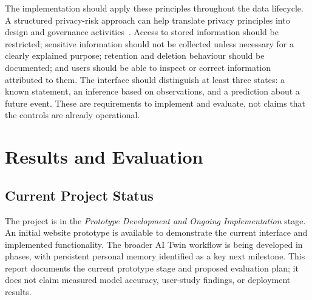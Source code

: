 \documentclass{tietreport}
\begin{document}
The implementation should apply these principles throughout the data lifecycle. A structured privacy-risk approach can help translate privacy principles into design and governance activities~\cite{nistprivacy2020}. Access to stored information should be restricted; sensitive information should not be collected unless necessary for a clearly explained purpose; retention and deletion behaviour should be documented; and users should be able to inspect or correct information attributed to them. The interface should distinguish at least three states: a known statement, an inference based on observations, and a prediction about a future event. These are requirements to implement and evaluate, not claims that the controls are already operational.

\chapter{Results and Evaluation}

\section{Current Project Status}
The project is in the \textit{Prototype Development and Ongoing Implementation} stage. An initial website prototype is available to demonstrate the current interface and implemented functionality. The broader AI Twin workflow is being developed in phases, with persistent personal memory identified as a key next milestone. This report documents the current prototype stage and proposed evaluation plan; it does not claim measured model accuracy, user-study findings, or deployment results.

\end{document}
